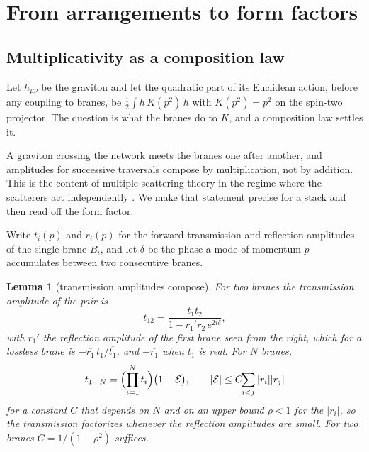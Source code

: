 \documentclass[aps,prd,10pt,twocolumn,superscriptaddress,nofootinbib,floatfix,longbibliography,showpacs,showkeys]{revtex4-2}
\theoremstyle{plain}
\newtheorem{lemma}{Lemma}
\theoremstyle{definition}
\theoremstyle{remark}
\begin{document}
\section{From arrangements to form factors}
\label{sec:gas}

\subsection{Multiplicativity as a composition law}
\label{sec:mult}

Let $h_{\mu\nu}$ be the graviton and let the quadratic part of its Euclidean action, before any coupling to branes, be $\tfrac12\int h\,K(p^2)\,h$ with $K(p^2)=p^2$ on the spin-two projector. The question is what the branes do to $K$, and a composition law settles it.

A graviton crossing the network meets the branes one after another, and amplitudes for successive traversals compose by multiplication, not by addition. This is the content of multiple scattering theory in the regime where the scatterers act independently \cite{Foldy1945,Lax1951}. We make that statement precise for a stack and then read off the form factor.

Write $t_i(p)$ and $r_i(p)$ for the forward transmission and reflection amplitudes of the single brane $B_i$, and let $\delta$ be the phase a mode of momentum $p$ accumulates between two consecutive branes.

\begin{lemma}[transmission amplitudes compose]
\label{lem:compose}
For two branes the transmission amplitude of the pair is
\begin{equation}
\label{eq:fabry}
t_{12}=\frac{t_1t_2}{1-r_1'r_2\,e^{2i\delta}},
\end{equation}
with $r_1'$ the reflection amplitude of the first brane seen from the right, which for a lossless brane is $-\overline{r_1}\,t_1/\overline{t_1}$, and $-\overline{r_1}$ when $t_1$ is real. For $N$ branes,
\begin{equation}
\label{eq:product}
t_{1\cdots N}=\Bigl(\prod_{i=1}^{N}t_i\Bigr)\bigl(1+\mathcal E\bigr),
\qquad
|\mathcal E|\le C\!\!\sum_{i<j}|r_i||r_j|
\end{equation}
for a constant $C$ that depends on $N$ and on an upper bound $\rho<1$ for the $|r_i|$, so the transmission factorizes whenever the reflection amplitudes are small. For two branes $C=1/(1-\rho^2)$ suffices.
\end{lemma}
\end{document}
